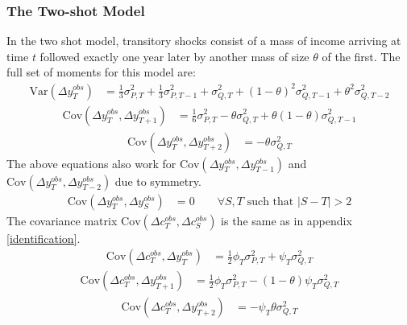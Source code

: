 \subsubsection{The Two-shot Model}
In the two shot model, transitory shocks consist of a mass of income arriving at time $t$ followed exactly one year later by another mass of size $\theta$ of the first. The full set of moments for this model are:
\begin{align*}
\mathrm{Var}(\Delta y^{obs}_T) &= \frac{1}{3}\sigma^2_{P,T} + \frac{1}{3}\sigma^2_{P,T-1} +  \sigma^2_{Q,T}   +(1-\theta)^2 \sigma^2_{Q,T-1} + \theta^2\sigma^2_{Q,T-2}
\end{align*}
\begin{align*}
\mathrm{Cov}(\Delta y^{obs}_T, \Delta y^{obs}_{T+1}) &= \frac{1}{6}\sigma^2_{P,T}  -\theta \sigma^2_{Q,T}  +\theta (1-\theta) \sigma^2_{Q,T-1}
\end{align*}
\begin{align*}
\mathrm{Cov}(\Delta y^{obs}_T, \Delta y^{obs}_{T+2})&= -\theta \sigma^2_{Q,T}
\end{align*}
The above equations also work for $\mathrm{Cov}(\Delta y^{obs}_T, \Delta y^{obs}_{T-1})$ and $\mathrm{Cov}(\Delta y^{obs}_T, \Delta y^{obs}_{T-2})$ due to symmetry.
\begin{align*}
\mathrm{Cov}(\Delta y^{obs}_T, \Delta y^{obs}_{S}) &= 0 \qquad \forall S,T \text{ such that }|S-T| >2 
\end{align*}
The covariance matrix $\mathrm{Cov}(\Delta c^{obs}_T, \Delta c^{obs}_{S})$ is the same as in appendix \ref{identification}.
\begin{align*}
\mathrm{Cov}(\Delta c^{obs}_T, \Delta y^{obs}_T) &= \frac{1}{2} \phi_T \sigma^2_{P,T} + \psi_T \sigma^2_{Q,T} 
\end{align*}
\begin{align*}
\mathrm{Cov}(\Delta c^{obs}_T, \Delta y^{obs}_{T+1})&= \frac{1}{2} \phi_T \sigma^2_{P,T} - (1-\theta) \psi_T \sigma^2_{Q,T} 
\end{align*}
\begin{align*}
\mathrm{Cov}(\Delta c^{obs}_T, \Delta y^{obs}_{T+2}) &= -\psi_T  \theta \sigma^2_{Q,T}
\end{align*}